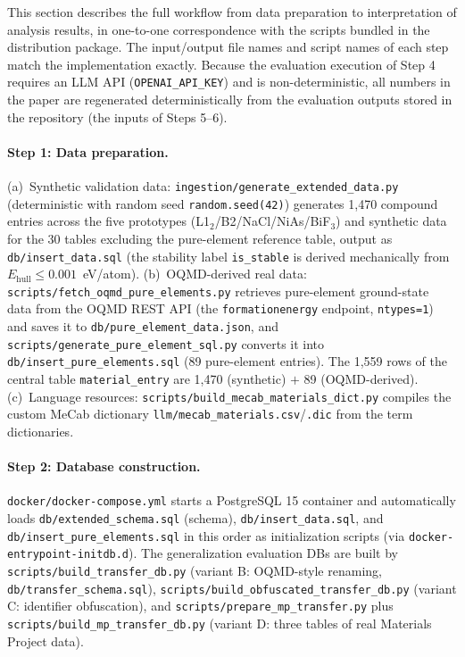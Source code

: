 This section describes the full workflow from data preparation to interpretation of analysis results, in one-to-one correspondence with the scripts bundled in the distribution package. The input/output file names and script names of each step match the implementation exactly. Because the evaluation execution of Step 4 requires an LLM API (\texttt{OPENAI\_API\_KEY}) and is non-deterministic, all numbers in the paper are regenerated deterministically from the evaluation outputs stored in the repository (the inputs of Steps 5--6).

\paragraph{Step 1: Data preparation.}
(a)~Synthetic validation data: \texttt{ingestion/generate\_extended\_data.py} (deterministic with random seed \texttt{random.seed(42)}) generates 1{,}470 compound entries across the five prototypes (L1$_2$/B2/NaCl/NiAs/BiF$_3$) and synthetic data for the 30 tables excluding the pure-element reference table, output as \texttt{db/insert\_data.sql} (the stability label \texttt{is\_stable} is derived mechanically from $E_\text{hull} \leq 0.001$~eV/atom).
(b)~OQMD-derived real data: \texttt{scripts/fetch\_oqmd\_pure\_elements.py} retrieves pure-element ground-state data from the OQMD REST API (the \texttt{formationenergy} endpoint, \texttt{ntypes=1}) and saves it to \texttt{db/pure\_element\_data.json}, and \texttt{scripts/generate\_pure\_element\_sql.py} converts it into \texttt{db/insert\_pure\_elements.sql} (89 pure-element entries). The 1{,}559 rows of the central table \texttt{material\_entry} are 1{,}470 (synthetic) $+$ 89 (OQMD-derived).
(c)~Language resources: \texttt{scripts/build\_mecab\_materials\_dict.py} compiles the custom MeCab dictionary \texttt{llm/mecab\_materials.csv}/\texttt{.dic} from the term dictionaries.

\paragraph{Step 2: Database construction.}
\texttt{docker/docker-compose.yml} starts a PostgreSQL 15 container and automatically loads \texttt{db/extended\_schema.sql} (schema), \texttt{db/insert\_data.sql}, and \texttt{db/insert\_pure\_elements.sql} in this order as initialization scripts (via \texttt{docker-entrypoint-initdb.d}). The generalization evaluation DBs are built by \texttt{scripts/build\_transfer\_db.py} (variant B: OQMD-style renaming, \texttt{db/transfer\_schema.sql}), \texttt{scripts/build\_obfuscated\_transfer\_db.py} (variant C: identifier obfuscation), and \texttt{scripts/prepare\_mp\_transfer.py} plus \texttt{scripts/build\_mp\_transfer\_db.py} (variant D: three tables of real Materials Project data).

